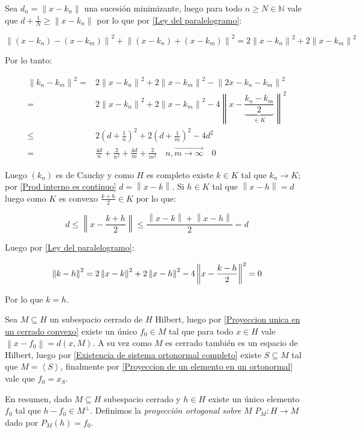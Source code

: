 \documentclass[11pt]{article}
\newcommand{\N}{{\mathbb{N}}}
\newcommand{\norm}[1]{\left\lVert#1\right\rVert}
\newcommand{\ip}[1]{\left\langle#1\right\rangle}
\numberwithin{theorem}{subsection}
\newenvironment{proof}[1][Demostraci\'on]{\begin{trivlist}
		\item[\hskip \labelsep {\bfseries #1}]}{\end{trivlist}}
\newenvironment{definition}[1][Definici\'on]{\begin{trivlist}
		\item[\hskip \labelsep {\bfseries #1}]}{\end{trivlist}}
\newcommand{\qed}{\nobreak \ifvmode \relax \else
	\ifdim\lastskip<1.5em \hskip-\lastskip
	\hskip1.5em plus0em minus0.5em \fi \nobreak
	\vrule height0.75em width0.5em depth0.25em\fi}
\begin{document}
\begin{proof}
	Sea $d_n = \norm{x-k_n}$ una sucesi\'on minimizante, luego para todo $n \geq N \in \N$ vale que $d + \frac{1}{N} \geq \norm{x-k_n}$ por lo que por \ref{Ley del paralelogramo}:
	
	\begin{equation*}
		\norm{(x-k_n) - (x-k_m)}^2 + \norm{(x-k_n) + (x-k_m)}^2 =  2 \norm{x-k_n}^2 + 2 \norm{x-k_m}^2
	\end{equation*}
	
	Por lo tanto:
	
	\[
	\begin{aligned}
		\norm{k_n-k_m}^2 = & 2 \norm{x-k_n}^2 + 2 \norm{x-k_m}^2  - \norm{2x-k_n -k_m}^2 \\
		= & 2 \norm{x-k_n}^2 + 2 \norm{x-k_m}^2  - 4\norm{x- \underbrace{\dfrac{k_n -k_m}{2}}_{\in K}}^2 \\
		\leq & 2 \left(d + \frac{1}{n}\right)^2 + 2 \left(d + \frac{1}{m}\right)^2 - 4d^2 \\
		= & \frac{4d}{n} + \frac{2}{n^2} + \frac{4d}{m} + \frac{2}{m^2} \quad  \overrightarrow{n,m \rightarrow \infty} \quad 0
	\end{aligned}
	\]
	
	Luego $(k_n)$ es de Cauchy y como $H$ es completo existe $k \in K$ tal que $k_n \rightarrow K$; por \ref{Prod interno es continuo} $d = \norm{x-k}$. Si $h \in K$ tal que $\norm{x-h} = d$ luego como $K$ es convexo $\frac{k+h}{2} \in K$ por lo que:
	
	\[
	d \leq \norm{x-\frac{k+h}{2}} \leq \dfrac{\norm{x-k} + \norm{x-h}}{2} = d
	\]
	
	Luego por \ref{Ley del paralelogramo}:
	
	\[
		\norm{k-h}^2 = 2 \norm{x-k}^2 + 2 \norm{x-h}^2  - 4\norm{x- \dfrac{k -h}{2}}^2 = 0 \\
	\]
	
	Por lo que $k = h$. \qed
\end{proof}

\begin{definition}
	Sea $M \subseteq H$ un subespacio cerrado de $H$ Hilbert, luego por \ref{Proyeccion unica en un cerrado convexo} existe un \'unico $f_0 \in M$ tal que para todo $x \in H$ vale $\norm{x-f_0} = d(x,M)$. A su vez como $M$ es cerrado tambi\'en es un espacio de Hilbert, luego por \ref{Existencia de sistema ortonormal completo} existe $S \subseteq M$ tal que $M = \ip{S}$, finalmente por \ref{Proyeccion de un elemento en un ortonormal} vale que $f_0 = x_S$.
	
	En resumen, dado $M \subseteq H$ subespacio cerrado y $h \in H$ existe un \'unico elemento $f_0$ tal que $h - f_0 \in M^{\perp}$. Definimos la \textit{proyecci\'on ortogonal sobre } $M$ $P_M:H \rightarrow M$ dado por $P_M(h) = f_0$.
\end{definition}
\end{document}
